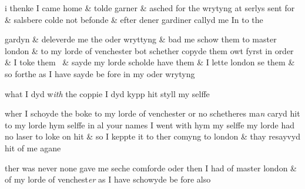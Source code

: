 \documentclass[12pt, a4paper]{book}
\begin{document}
		\ifthenelse{\isodd{\thepage}}
		{\reversemarginpar}
		{\normalmarginpar}
		i thenke I came home \& tolde garner \& asched for the wrytyng
  at serlys sent for
			 \& salsbere colde not befonde \& efter dener gardiner
			 callyd me In to the
               
 gardyn \& deleverde me the oder wryttyng \& bad me schow
 them to master london \& to my lorde of venchester bot
 schether copyde them owt fyrst in order \& I toke them 
 \& sayde my lorde scholde have them \& I lette london se them
 \& so forthe as I have sayde be fore in my oder wrytyng
 

            	
				\marginpar[\vspace{0.5cm}{\textcolor{Gray}{5.}}]{}
			
		\ifthenelse{\isodd{\thepage}}
		{\reversemarginpar}
		{\normalmarginpar}
		what I dyd w\textit{ith} the coppie I dyd kypp hit styll my selffe
 


				\marginpar[\vspace{0.5cm}{\textcolor{Gray}{n}}]{}
			
	
				\marginpar[\vspace{0.5cm}{\textcolor{Gray}{6.}}]{}
			
		\ifthenelse{\isodd{\thepage}}
		{\reversemarginpar}
		{\normalmarginpar}
		wher I schoyde the boke to my lorde of venchester or no
		schetheres ma\textit{n} caryd hit to my lorde hym selffe in al your names
			 I went with
 hym my selffe my lorde had no laser to loke on hit \& so I keppte
 it to ther comyng to london \& thay resayvyd hit of me agane
 

            	
				\marginpar[\vspace{0.5cm}{\textcolor{Gray}{7.}}]{}
			
		\ifthenelse{\isodd{\thepage}}
		{\reversemarginpar}
		{\normalmarginpar}
		ther was never none gave me seche comforde oder
            		then I had of master london \& of my lorde of venchest\textit{er}
 as I have schowyde be fore also
 

            	
				\marginpar[\vspace{0.5cm}{\textcolor{Gray}{8.}}]{}
			
\end{document}
